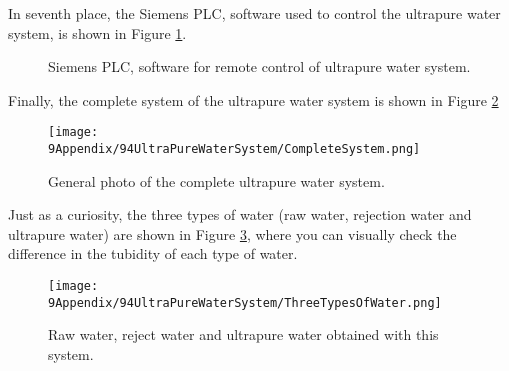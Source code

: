 In seventh place, the Siemens PLC, software used to control the ultrapure water system, is shown in Figure \ref{fig:Siemens}.

\begin{figure}[htbp]
 \centering
 \caption{Siemens PLC, software for remote control of ultrapure water system.}
 \label{fig:Siemens}
\end{figure}

Finally, the complete system of the ultrapure water system is shown in Figure \ref{fig:CompleteSystem}

\begin{figure}[htbp]
\centering
\texttt{[image: 9Appendix/94UltraPureWaterSystem/CompleteSystem.png]}
\caption{General photo of the complete ultrapure water system.\label{fig:CompleteSystem}}
\end{figure}

Just as a curiosity, the three types of water (raw water, rejection water and ultrapure water) are shown in Figure \ref{fig:ThreeTypesOfWater}, where you can visually check the difference in the tubidity of each type of water.

\begin{figure}[htbp]
\centering
\texttt{[image: 9Appendix/94UltraPureWaterSystem/ThreeTypesOfWater.png]}
\caption{Raw water, reject water and ultrapure water obtained with this system.\label{fig:ThreeTypesOfWater}}
\end{figure}
